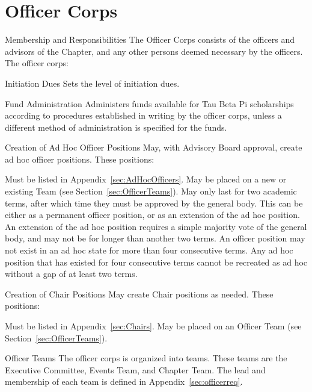 \section{Officer Corps}\label{sec:officercorps} 
\begin{enumsubsection}
\item{Membership and Responsibilities} The Officer Corps consists of the officers and advisors of the Chapter, and any other persons deemed necessary by the officers. The officer corps:
\begin{enumsubsubsection}
\item*{Initiation Dues} Sets the level of initiation dues.
\item*{Fund Administration} Administers funds available for Tau Beta Pi scholarships according to procedures established in writing by the officer corps, unless a different method of administration is specified for the funds.
\item*{Creation of Ad Hoc Officer Positions}\label{sec:AdHocCreation} May, with Advisory Board approval, create ad hoc officer positions. These positions:
\begin{enumerate}
	\itemnotoc Must be listed in Appendix~\ref{sec:AdHocOfficers}.
	\itemnotoc May be placed on a new or existing Team (see Section~\ref{sec:OfficerTeams}).
	\itemnotoc May only last for two academic terms, after which time they must be approved by the general body. This can be either as a permanent officer position, or as an extension of the ad hoc position. An extension of the ad hoc position requires a simple majority vote of the general body, and may not be for longer than another two terms. An officer position may not exist in an ad hoc state for more than four consecutive terms. Any ad hoc position that has existed for four consecutive terms cannot be recreated as ad hoc without a gap of at least two terms.
\end{enumerate}
\item*{Creation of Chair Positions}\label{sec:ChairCreation} May create Chair positions as needed. These positions:
\begin{enumerate}
	\itemnotoc Must be listed in Appendix~\ref{sec:Chairs}.
	\itemnotoc May be placed on an Officer Team (see Section~\ref{sec:OfficerTeams}).
\end{enumerate}
 \end{enumsubsubsection}
\item{Officer Teams}\label{sec:OfficerTeams} The officer corps is organized into teams. These teams are the Executive Committee, Events Team, and Chapter Team. The lead and membership of each team is defined in Appendix~\ref{sec:officerreq}. %


\end{enumsubsection}
